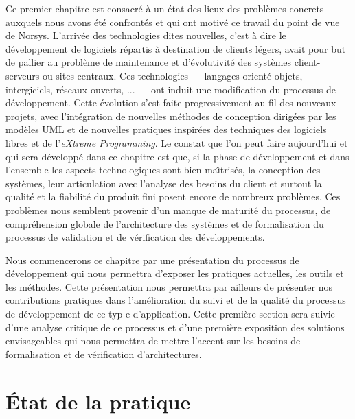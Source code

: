 
Ce premier chapitre est consacr\'e \`a un \'etat des
lieux des probl\`emes concrets auxquels nous avons
\'et\'e confront\'es et qui ont motiv\'e ce travail du point de
vue de \textsf{Norsys}. L'arriv\'ee des technologies dites nouvelles,
c'est \`a dire le d\'eveloppement de logiciels r\'epartis \`a
destination de clients l\'egers, avait pour but de pallier au probl\`eme de
maintenance et d'\'evolutivit\'e des syst\`emes client-serveurs ou
sites centraux. Ces technologies --- langages orient\'e-objets,
intergiciels, r\'eseaux ouverts, ... ---  ont induit une modification du processus de
d\'eveloppement. Cette \'evolution s'est faite progressivement au
fil des nouveaux projets, avec
l'int\'egration de nouvelles m\'ethodes de conception dirig\'ees
par les mod\`eles \textsf{UML} et de nouvelles pratiques  inspir\'ees
des techniques des logiciels libres et de 
l'\emph{eXtreme Programming}. Le constat que l'on peut faire
aujourd'hui et qui sera d\'evelopp\'e dans ce chapitre est que, si
la phase de d\'eveloppement et dans l'ensemble les aspects
technologiques sont bien ma\^{\i}tris\'es, la conception des
syst\`emes, leur articulation avec l'analyse des besoins du client et
surtout la qualit\'e et la fiabilit\'e du produit fini posent encore
de nombreux probl\`emes. Ces probl\`emes nous semblent provenir d'un manque de
maturit\'e du processus, de compr\'ehension globale de
l'architecture des syst\`emes et de formalisation du processus de
validation et de v\'erification des d\'eveloppements. 

Nous commencerons ce chapitre par une pr\'esentation du processus de
d\'eveloppement qui nous permettra d'exposer les pratiques actuelles, les outils et  les
m\'ethodes. Cette pr\'esentation nous permettra par ailleurs de
pr\'esenter nos contributions pratiques dans l'am\'elioration du
suivi et de la qualit\'e du processus de d\'eveloppement de ce typ e
d'application. Cette premi\`ere section sera suivie d'une analyse
critique de ce processus et d'une premi\`ere exposition des solutions
envisageables qui nous permettra de mettre l'accent sur les besoins de
formalisation et de v\'erification d'architectures.

\section{\'Etat de la pratique}

